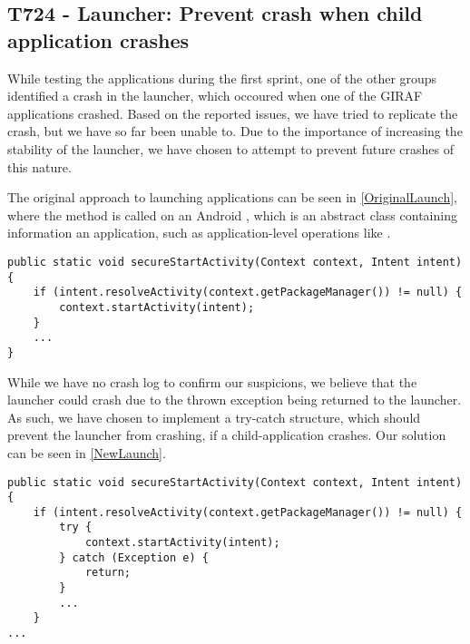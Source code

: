 \subsection{T724 - Launcher: Prevent crash when child application crashes}
While testing the applications during the first sprint, one of the other groups
identified a crash in the launcher, which occoured when one of the GIRAF
applications crashed. Based on the reported issues, we have tried to
replicate the crash, but we have so far been unable to. Due to the importance of
increasing the stability of the launcher, we have chosen to attempt to prevent
future crashes of this nature.\nl

The original approach to launching applications can be seen in
\autoref{OriginalLaunch}, where the  method is called on an
Android , which is an abstract class containing information an
application, such as application-level operations like
.\nl

\begin{minipage}[H]{\linewidth}
\begin{lstlisting}[caption = Original approach to launching applications., label = OriginalLaunch]
public static void secureStartActivity(Context context, Intent intent) {
	if (intent.resolveActivity(context.getPackageManager()) != null) {	
    	context.startActivity(intent);
	}
	...
}
\end{lstlisting}
\end{minipage}

While we have no crash log to confirm our suspicions, we believe that the
launcher could crash due to the thrown exception being returned to the launcher.
As such, we have chosen to implement a try-catch structure, which should prevent
the launcher from crashing, if a child-application crashes. Our solution can be 
seen in \autoref{NewLaunch}.\nl

\begin{minipage}[H]{\linewidth}
\begin{lstlisting}[caption = New approach to launching applications., label = NewLaunch] 
public static void secureStartActivity(Context context, Intent intent) {
	if (intent.resolveActivity(context.getPackageManager()) != null) {
    	try {
        	context.startActivity(intent);
        } catch (Exception e) {
        	return;
        }
        ...
    }
...
\end{lstlisting}
\end{minipage}



